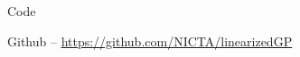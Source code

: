 \documentclass[final]{beamer}
\newlength{\onecolwid}
\begin{document}
\begin{frame}[t]
\begin{columns}[t]
\begin{column}{\onecolwid}




\vspace{-2cm}
\begin{alertblock}{Code}

Github -- \href{https://github.com/NICTA/linearizedGP}
                 {https://github.com/NICTA/linearizedGP}
\end{alertblock}


\end{column} %

\end{columns} %

\end{frame} %
\end{document}
